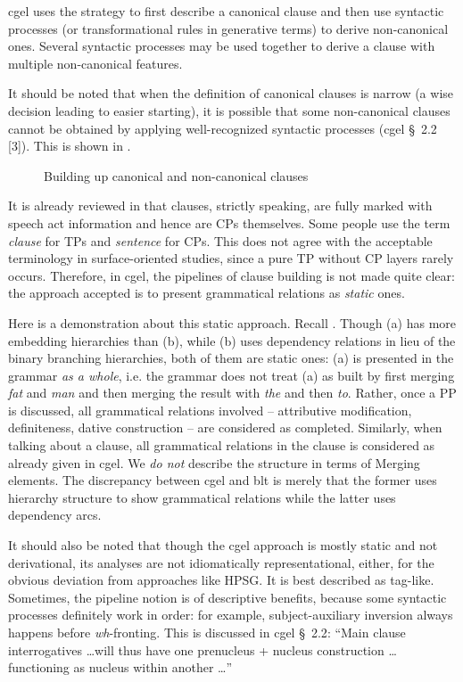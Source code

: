 \documentclass{article}
\newcommand*{\citesec}[1]{\S~{#1}}
\newcommand*{\term}[1]{\emph{#1}}
\newcommand*{\corpus}[1]{\emph{#1}}
\begin{document}
\ac{cgel} uses the strategy to first describe a canonical clause 
and then use syntactic processes (or transformational rules in generative terms) 
to derive non-canonical ones.
Several syntactic processes may be used together to derive a clause with multiple non-canonical features.

It should be noted that when the definition of canonical clauses is narrow 
(a wise decision leading to easier starting),
it is possible that some non-canonical clauses cannot be obtained 
by applying well-recognized syntactic processes (\ac{cgel} \citesec{2.2} [3]).
This is shown in .

\begin{figure}
    \centering
    
    \caption{Building up canonical and non-canonical clauses}
    \label{fig:canonical-clause}
\end{figure}

It is already reviewed in  that clauses, strictly speaking, 
are fully marked with speech act information and hence are CPs themselves.
Some people use the term \term{clause} for TPs and \term{sentence} for CPs.
This does not agree with the acceptable terminology in surface-oriented studies,
since a pure TP without CP layers rarely occurs.
Therefore, in \ac{cgel}, the pipelines of clause building is not made quite clear:
the approach accepted is to present grammatical relations as \emph{static} ones.

Here is a demonstration about this static approach. Recall .
Though (a) has more embedding hierarchies than (b),
while (b) uses dependency relations in lieu of the binary branching hierarchies,
both of them are static ones:
(a) is presented in the grammar \emph{as a whole}, 
i.e. the grammar does not treat (a) as built by first merging \corpus{fat} and \corpus{man}
and then merging the result with \corpus{the} and then \corpus{to}.
Rather, once a PP is discussed, all grammatical relations involved
-- attributive modification, definiteness, dative construction -- 
are considered as completed.
Similarly, when talking about a clause, 
all grammatical relations in the clause is considered as already given in \ac{cgel}.
We \emph{do not} describe the structure in terms of Merging elements.
The discrepancy between \ac{cgel} and \ac{blt} is merely that 
the former uses hierarchy structure to show grammatical relations while the latter uses dependency arcs.

It should also be noted that though the \ac{cgel} approach is mostly static and not derivational,
its analyses are not idiomatically representational, either,
for the obvious deviation from approaches like HPSG.
It is best described as \ac{tag}-like.
Sometimes, the pipeline notion is of descriptive benefits, 
because some syntactic processes definitely work in order:
for example, subject-auxiliary inversion always happens before \term{wh}-fronting.
This is discussed in \ac{cgel} \citesec{2.2}: 
``Main clause interrogatives \dots will 
thus have one prenucleus + nucleus construction \dots functioning as nucleus within another \dots''
\end{document}
